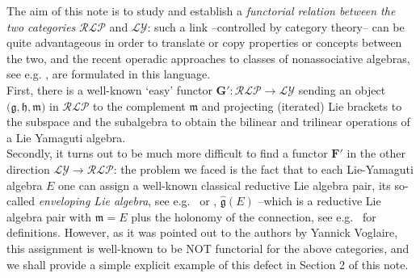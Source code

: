 \documentclass [11pt] {article}
\theoremstyle{definition}
\begin{document}
The aim of this note is to study and establish a \textit{functorial relation between the two categories}
$\mathcal{RLP}$ and $\mathcal{LY}$: such a link --controlled by category theory--
can be quite advantageous in order to translate or copy properties or concepts between the two, and the recent operadic approaches to classes of nonassociative
algebras, see e.g. \cite{CD}, are formulated in this language.\\
First, there is a well-known `easy' functor 
$\mathbf{G}':\mathcal{RLP}\to \mathcal{LY}$ sending an object $\big(\mathfrak{g},\mathfrak{h},\mathfrak{m}\big)$ in $\mathcal{RLP}$ to the complement $\mathfrak{m}$ and projecting (iterated) Lie brackets to the subspace and the subalgebra to obtain the bilinear and trilinear operations of a Lie Yamaguti algebra.\\
Secondly, it turns out to be much more difficult to find a functor $\mathbf{F'}$ in the other direction $\mathcal{LY}\to \mathcal{RLP}$:  the problem we faced is the fact
that to each Lie-Yamaguti algebra $E$ one can assign a well-known classical
reductive Lie algebra pair, its so-called \textit{enveloping Lie algebra}, see e.g.~\cite{Yam58} or \cite[p.~542]{KW01}, $\hat{\mathfrak{g}}(E)$ --which is a reductive Lie algebra pair with $\mathfrak{m}=E$ plus the holonomy of the connection, see e.g.~\cite[p.~206]{KN63}
for definitions. However, as it was pointed out to the authors by Yannick Voglaire, this assignment is well-known to be NOT functorial for the above categories, and we shall provide 
a simple explicit example of this defect in Section 2 of this note.
\end{document}
